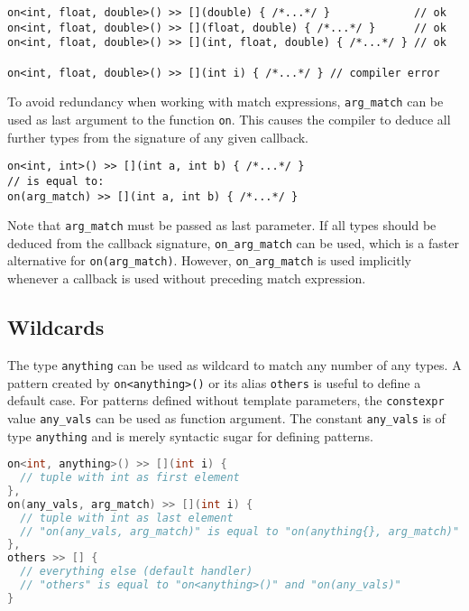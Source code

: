 \begin{lstlisting}
on<int, float, double>() >> [](double) { /*...*/ }             // ok
on<int, float, double>() >> [](float, double) { /*...*/ }      // ok
on<int, float, double>() >> [](int, float, double) { /*...*/ } // ok

on<int, float, double>() >> [](int i) { /*...*/ } // compiler error
\end{lstlisting}

To avoid redundancy when working with match expressions, \lstinline^arg_match^ can be used as last argument to the function \lstinline^on^.
This causes the compiler to deduce all further types from the signature of any given callback.

\begin{lstlisting}
on<int, int>() >> [](int a, int b) { /*...*/ }
// is equal to:
on(arg_match) >> [](int a, int b) { /*...*/ }
\end{lstlisting}

Note that \lstinline^arg_match^ must be passed as last parameter.
If all types should be deduced from the callback signature, \lstinline^on_arg_match^ can be used, which is a faster alternative for \lstinline^on(arg_match)^.
However, \lstinline^on_arg_match^ is used implicitly whenever a callback is used without preceding match expression.

\subsection{Wildcards}

The type \lstinline^anything^ can be used as wildcard to match any number of any types.
A pattern created by \lstinline^on<anything>()^ or its alias \lstinline^others^ is useful to define a default case.
For patterns defined without template parameters, the \lstinline^constexpr^ value \lstinline^any_vals^ can be used as function argument.
The constant \lstinline^any_vals^ is of type \lstinline^anything^ and is merely syntactic sugar for defining patterns.

\begin{lstlisting}[language=C++]
on<int, anything>() >> [](int i) {
  // tuple with int as first element
},
on(any_vals, arg_match) >> [](int i) {
  // tuple with int as last element
  // "on(any_vals, arg_match)" is equal to "on(anything{}, arg_match)"
},
others >> [] {
  // everything else (default handler)
  // "others" is equal to "on<anything>()" and "on(any_vals)"
}
\end{lstlisting}


